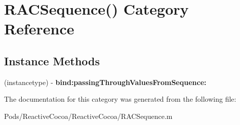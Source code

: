 \hypertarget{category_r_a_c_sequence_07_08}{}\section{R\+A\+C\+Sequence() Category Reference}
\label{category_r_a_c_sequence_07_08}
\subsection*{Instance Methods}
\begin{DoxyCompactItemize}
\item 
\mbox{\label{category_r_a_c_sequence_07_08_a4c5652687ba9ec025da2b0eaa3d81278}} 
(instancetype) -\/ {\bfseries bind\+:passing\+Through\+Values\+From\+Sequence\+:}
\end{DoxyCompactItemize}


The documentation for this category was generated from the following file\+:\begin{DoxyCompactItemize}
\item 
Pods/\+Reactive\+Cocoa/\+Reactive\+Cocoa/R\+A\+C\+Sequence.\+m\end{DoxyCompactItemize}
